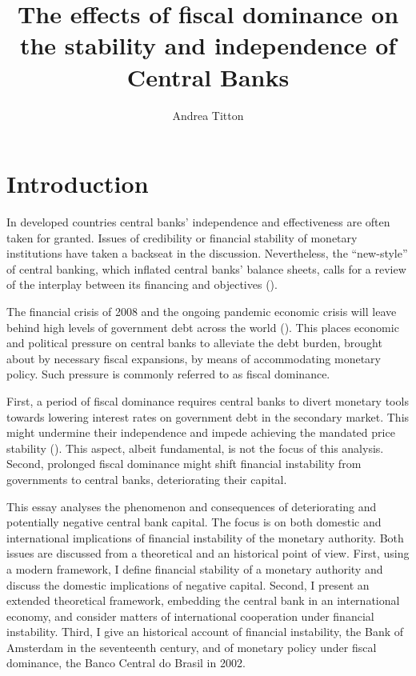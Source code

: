 \documentclass[american]{scrartcl}
\title{The effects of fiscal dominance on the stability and independence of Central Banks}
\author{Andrea Titton}
\begin{document}
\clearpage
\thispagestyle{empty}
\maketitle
\clearpage



\section{Introduction}

In developed countries central banks' independence and effectiveness are often taken for granted. Issues of credibility or financial stability of monetary institutions have taken a backseat in the discussion. Nevertheless, the ``new-style'' of central banking, which inflated central banks' balance sheets, calls for a review of the interplay between its financing and objectives (\cite{Hall2015}).

The financial crisis of 2008 and the ongoing pandemic economic crisis will leave behind high levels of government debt across the world (\cite{WEO2020}). This places economic and political pressure on central banks to alleviate the debt burden, brought about by necessary fiscal expansions, by means of accommodating monetary policy. Such pressure is commonly referred to as fiscal dominance.

First, a period of fiscal dominance requires central banks to divert monetary tools towards lowering interest rates on government debt in the secondary market. This might undermine their independence and impede achieving the mandated price stability (\cite{FernandezAlbertos2015}). This aspect, albeit fundamental, is not the focus of this analysis. Second, prolonged fiscal dominance might shift financial instability from governments to central banks, deteriorating their capital.

This essay analyses the phenomenon and consequences of deteriorating and potentially negative central bank capital. The focus is on both domestic and international implications of financial instability of the monetary authority. Both issues are discussed from a theoretical and an historical point of view. First, using a modern framework, I define financial stability of a monetary authority and discuss the domestic implications of negative capital. Second, I present an extended theoretical framework, embedding the central bank in an international economy, and consider matters of international cooperation under financial instability. Third, I give an historical account of financial instability, the Bank of Amsterdam in the seventeenth century, and of monetary policy under fiscal dominance, the Banco Central do Brasil in 2002.
\end{document}
